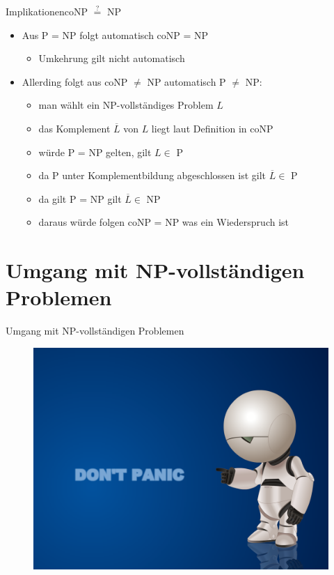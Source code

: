 \documentclass[ignorenonframetext,]{beamer}
\begin{document}
\begin{frame}{Implikationen}{coNP $\stackrel{?}{=}$ NP}

\begin{itemize}
\itemsep1pt\parskip0pt
\item
  Aus P = NP folgt automatisch coNP = NP

  \begin{itemize}
  \itemsep1pt\parskip0pt
  \item
    Umkehrung gilt nicht automatisch
  \end{itemize}
\item
  Allerding folgt aus coNP $\neq$ NP automatisch P $\neq$ NP:

  \begin{itemize}
  \itemsep1pt\parskip0pt
  \item
    man wählt ein NP-vollständiges Problem $L$
  \item
    das Komplement $\overline{L}$ von $L$ liegt laut Definition in coNP
  \item
    würde P = NP gelten, gilt $L \in$ P
  \item
    da P unter Komplementbildung abgeschlossen ist gilt
    $\overline{L} \in$ P
  \item
    da gilt P = NP gilt $\overline{L} \in$ NP
  \item
    daraus würde folgen coNP = NP was ein Wiederspruch ist
  \end{itemize}
\end{itemize}

\end{frame}


\section[Umgang]{Umgang mit NP-vollständigen Problemen}

\begin{frame}{Umgang mit NP-vollständigen Problemen}

\begin{figure}[htbp]
\centering
\includegraphics{img/dont_panic.png}
\end{figure}

\end{frame}
\end{document}
